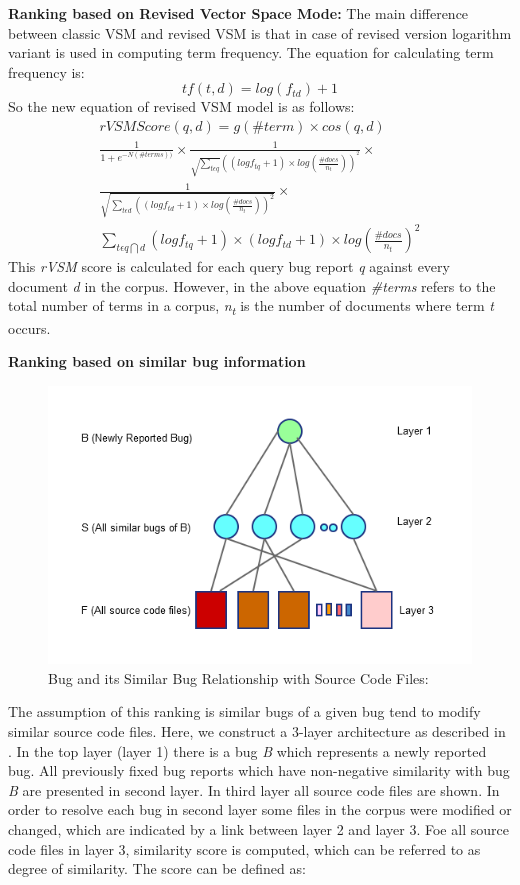 \documentclass[conference]{IEEEtran}
\begin{document}
\textbf{Ranking based on Revised Vector Space Mode:}
The main difference between classic VSM and revised VSM is that in case of revised version logarithm variant is used in computing term frequency. The equation for calculating term frequency is:
\begin{equation}
tf(t,d)=log(f_{td})+1
\end{equation}
So the new equation of revised VSM model is as follows:
\begin{multline}\label{rVSMequation}
rVSMScore(q,d)=g(\#term)\times cos(q,d)
\\
\frac{1}{1+e^{-N(\#terms))}}\times \frac{1}{\sqrt{\sum_{t\epsilon q}}((logf_{tq}+1)\times log(\frac{\#docs}{n_{t}}))^{^{2}}}\times 
\\
\frac{1}{\sqrt{\sum_{t\epsilon d}((log {f_{td}+1})\times log(\frac{\#docs}{n_{t}}))^{2}}}\times
\\
\sum_{t\epsilon q\bigcap d}(logf_{tq}+1)\times (logf_{td}+1)\times log(\frac{\#docs}{n_{t}})^{2}
\end{multline}
This \textit{rVSM} score is calculated for each query bug report \textit{q} against every document \textit{d} in the corpus. However, in the above equation \textit{\#terms} refers to the total number of terms in a corpus, \textit{n\textsubscript{t}} is the number of documents where term \textit{t} occurs.

\textbf{Ranking based on similar bug information}
\begin{figure}
	\centering
	\includegraphics[scale=0.50]{3layers}
	\caption{Bug and its Similar Bug Relationship with Source Code Files:}
	\label{fig:BSBR}
\end{figure}
The assumption of this ranking is similar bugs of a given bug tend to modify similar source code files. Here, we construct a 3-layer architecture as described in \cite{Jian}. In the top layer (layer 1) there is a bug \textit{B} which represents a newly reported bug. All previously fixed bug reports which have non-negative similarity with bug  \textit{B} are presented in second layer. In third layer all source code files are shown. In order to resolve each bug in second layer some files in the corpus were modified or changed, which are indicated by a link between layer 2 and layer 3. Foe all source code files in layer 3, similarity score is computed, which can be referred to as degree of similarity. The score can be defined as:
\end{document}
